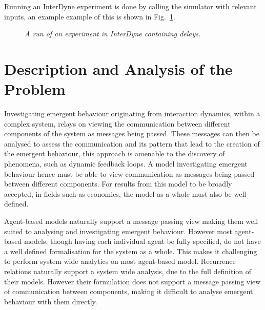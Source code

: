 \documentclass{article}
\begin{document}


Running an InterDyne experiment is done by calling the simulator with relevant inputs, an example example of this is shown in Fig.~\ref{fig:runninginterdyne}.
\begin{figure}[H]
	\centering
        
	\caption{\it A run of an experiment in InterDyne containing delays.}
	\label{fig:runninginterdyne}
\end{figure} 









\section {Description and Analysis of the Problem} \label{despriptionandanalysproblem}

Investigating emergent behaviour originating from interaction dynamics, within a complex system, relays on viewing the communication between different components of the system as messages being passed. These messages can then be analysed to assess the communication and its pattern that lead to the creation of the emergent behaviour, this approach is amenable to the discovery of phenomena, such as dynamic feedback loops. A model investigating emergent behaviour hence must be able to view communication as messages being passed between different components. For results from this model to be broadly accepted, in fields such as economics, the model as a whole must also be well defined.      

Agent-based models naturally support a message passing view making them well suited to analysing and investigating emergent behaviour. However most agent-based models, though having each individual agent be fully specified, do not have a well defined formalisation for the system as a whole. This makes it challenging to perform system wide analytics on most agent-based model. Recurrence relations naturally support a system wide analysis, due to the full definition of their models. However their formulation does not support a message passing view of communication between components, making it difficult to analyse emergent behaviour with them directly. 
\end{document}
